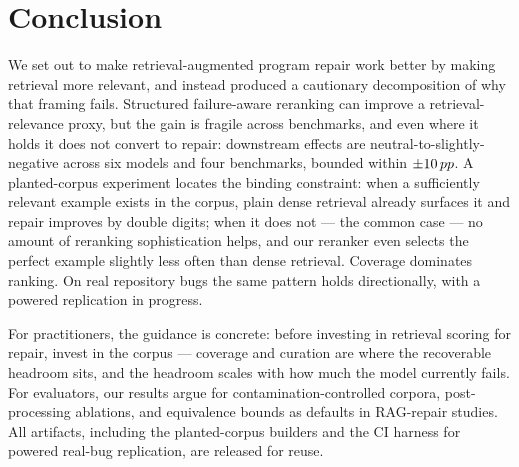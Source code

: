\section{Conclusion}
\label{sec:conclusion}

We set out to make retrieval-augmented program repair work better by making
retrieval more relevant, and instead produced a cautionary decomposition of
why that framing fails. Structured failure-aware reranking can improve a
retrieval-relevance proxy, but the gain is fragile across benchmarks, and
even where it holds it does not convert to repair: downstream effects are
neutral-to-slightly-negative across six models and four benchmarks, bounded
within $\pm 10\,pp$. A planted-corpus experiment locates the binding
constraint: when a sufficiently relevant example exists in the corpus, plain
dense retrieval already surfaces it and repair improves by double digits;
when it does not --- the common case --- no amount of reranking
sophistication helps, and our reranker even selects the perfect example
slightly less often than dense retrieval. Coverage dominates ranking. On real
repository bugs the same pattern holds directionally, with a powered
replication in progress.

For practitioners, the guidance is concrete: before investing in retrieval
scoring for repair, invest in the corpus --- coverage and curation are where
the recoverable headroom sits, and the headroom scales with how much the
model currently fails. For evaluators, our results argue for
contamination-controlled corpora, post-processing ablations, and equivalence
bounds as defaults in RAG-repair studies. All artifacts, including the
planted-corpus builders and the CI harness for powered real-bug replication,
are released for reuse.
